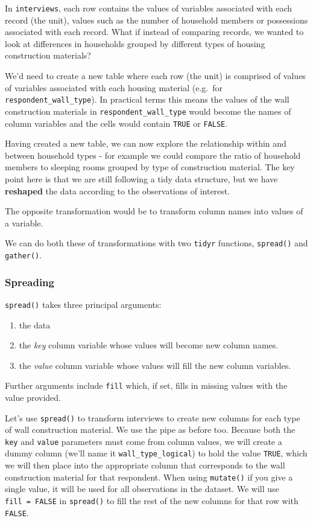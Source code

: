 \documentclass[]{book}
\providecommand{\tightlist}{%
  \setlength{\itemsep}{0pt}\setlength{\parskip}{0pt}}
\begin{document}
In \texttt{interviews}, each row contains the values of variables
associated with each record (the unit), values such as the number of
household members or possessions associated with each record. What if
instead of comparing records, we wanted to look at differences in
households grouped by different types of housing construction materials?

We'd need to create a new table where each row (the unit) is comprised
of values of variables associated with each housing material (e.g.~for
\texttt{respondent\_wall\_type}). In practical terms this means the
values of the wall construction materials in
\texttt{respondent\_wall\_type} would become the names of column
variables and the cells would contain \texttt{TRUE} or \texttt{FALSE}.

Having created a new table, we can now explore the relationship within
and between household types - for example we could compare the ratio of
household members to sleeping rooms grouped by type of construction
material. The key point here is that we are still following a tidy data
structure, but we have \textbf{reshaped} the data according to the
observations of interest.

The opposite transformation would be to transform column names into
values of a variable.

We can do both these of transformations with two \texttt{tidyr}
functions, \texttt{spread()} and \texttt{gather()}.

\subsubsection{Spreading}\label{spreading}

\texttt{spread()} takes three principal arguments:

\begin{enumerate}
\def\labelenumi{\arabic{enumi}.}
\tightlist
\item
  the data
\item
  the \emph{key} column variable whose values will become new column
  names.
\item
  the \emph{value} column variable whose values will fill the new column
  variables.
\end{enumerate}

Further arguments include \texttt{fill} which, if set, fills in missing
values with the value provided.

Let's use \texttt{spread()} to transform interviews to create new
columns for each type of wall construction material. We use the pipe as
before too. Because both the \texttt{key} and \texttt{value} parameters
must come from column values, we will create a dummy column (we'll name
it \texttt{wall\_type\_logical}) to hold the value \texttt{TRUE}, which
we will then place into the appropriate column that corresponds to the
wall construction material for that respondent. When using
\texttt{mutate()} if you give a single value, it will be used for all
observations in the dataset. We will use \texttt{fill\ =\ FALSE} in
\texttt{spread()} to fill the rest of the new columns for that row with
\texttt{FALSE}.
\end{document}
